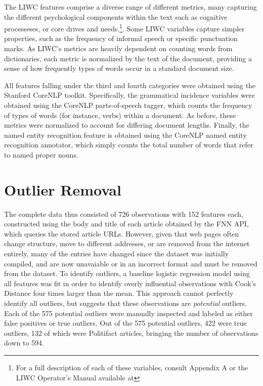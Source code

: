 \documentclass[../thesis.tex]{subfiles}
\begin{document}
The LIWC features comprise a diverse range of different metrics, many capturing the different psychological components within the text such as cognitive processeses, or core drives and needs.\footnote{For a full description of each of these variables, consult Appendix A or the LIWC Operator's Manual available at}. Some LIWC variables capture simpler properties, such as the frequency of informal speech or specific punctuation marks. As LIWC's metrics are heavily dependent on counting words from dictionaries, each metric is normalized by the text of the document, providing a sense of how frequently types of words occur in a standard document size.

All features falling under the third and fourth categories were obtained using the Stanford CoreNLP toolkit. Specifically, the grammatical incidence variables were obtained using the CoreNLP parts-of-speech tagger, which counts the frequency of types of words (for instance, verbs) within a document. As before, these metrics were normalized to account for differing document lengths. Finally, the named entity recognition feature is obtained using the CoreNLP named entity recognition annotator, which simply counts the total number of words that refer to named proper nouns.

\section{Outlier Removal}

The complete data thus consisted of 726 observations with 152 features each, constructed using the body and title of each article obtained by the FNN API, which queries the stored article URLs. However, given that web pages often change structure, move to different addresses, or are removed from the internet entirely, many of the entries have changed since the dataset was initially compiled, and are now unavaiable or in an incorrect format and must be removed from the dataset. To identify outliers, a baseline logistic regression model using all features was fit in order to identify overly influential observations with Cook's Distance four times larger than the mean. This approach cannot perfectly identify all outliers, but suggests that these observations are \emph{potential} outliers. Each of the 575 potential outliers were manually inspected and labeled as either false positives or true outliers. Out of the 575 potential outliers, 422 were true outliers, 132 of which were Politifact articles, bringing the number of observations down to 594.
\end{document}
